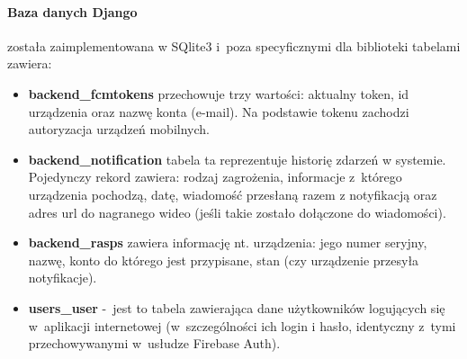 \paragraph{Baza danych Django} została zaimplementowana w SQlite3 i~poza specyficznymi dla biblioteki tabelami zawiera:
\begin{itemize}
	\item \textbf{backend\_fcmtokens} przechowuje trzy wartości: aktualny token, id urządzenia oraz nazwę konta (e-mail). Na podstawie tokenu zachodzi autoryzacja urządzeń mobilnych.
	\item \textbf{backend\_notification} tabela ta reprezentuje historię zdarzeń w systemie. Pojedynczy rekord zawiera: rodzaj zagrożenia, informacje z~którego urządzenia pochodzą, datę, wiadomość przesłaną razem z notyfikacją oraz adres url do nagranego wideo (jeśli takie zostało dołączone do wiadomości).
	\item \textbf{backend\_rasps} zawiera informację nt. urządzenia: jego numer seryjny, nazwę, konto do którego jest przypisane, stan (czy urządzenie przesyła notyfikacje).
	\item \textbf{users\_user} -~jest to tabela zawierająca dane użytkowników logujących się w~aplikacji internetowej (w~szczególności ich login i hasło, identyczny z~tymi przechowywanymi w~usłudze Firebase Auth).
\end{itemize}
